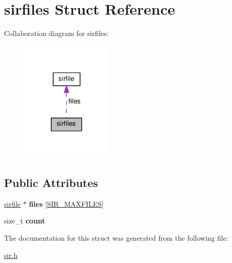 \hypertarget{structsirfiles}{}\section{sirfiles Struct Reference}
\label{structsirfiles}


Collaboration diagram for sirfiles\+:\nopagebreak
\begin{figure}[H]
\begin{center}
\leavevmode
\includegraphics[width=125pt]{structsirfiles__coll__graph}
\end{center}
\end{figure}
\subsection*{Public Attributes}
\begin{DoxyCompactItemize}
\item 
\hyperlink{structsirfile}{sirfile} $\ast$ {\bfseries files} \mbox{[}\hyperlink{sir_8h_aa1080a4bec531adb6d25c87ac4734399}{S\+I\+R\+\_\+\+M\+A\+X\+F\+I\+L\+ES}\mbox{]}\hypertarget{structsirfiles_a65c5e5be7ebd527d2304fc8d6cf30b45}{}\label{structsirfiles_a65c5e5be7ebd527d2304fc8d6cf30b45}

\item 
size\+\_\+t {\bfseries count}\hypertarget{structsirfiles_a021828ca86b408a02dee81fb8e4ade6f}{}\label{structsirfiles_a021828ca86b408a02dee81fb8e4ade6f}

\end{DoxyCompactItemize}


The documentation for this struct was generated from the following file\+:\begin{DoxyCompactItemize}
\item 
\hyperlink{sir_8h}{sir.\+h}\end{DoxyCompactItemize}
